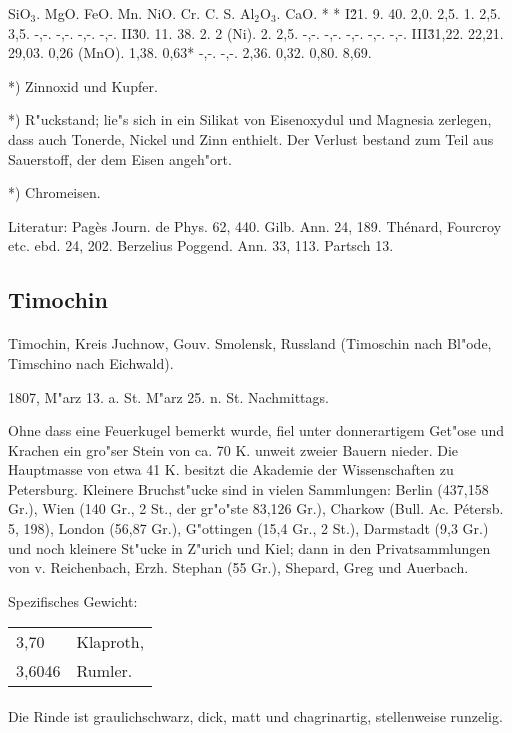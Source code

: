 \documentclass[a4paper, 11pt, oneside]{article}
\begin{document}
SiO$_{3}$. MgO. FeO. Mn. NiO. Cr. C. S. Al$_{2}$O$_{3}$. CaO. * *  
I\. 21. 9. 40. 2,0. 2,5. 1. 2,5. 3,5. -,-. -,-. -,-. -,-.  
II\. 30. 11. 38. 2. 2 (Ni). 2. 2,5. -,-. -,-. -,-. -,-. -,-.  
III\. 31,22. 22,21. 29,03. 0,26 (MnO). 1,38. 0,63* -,-. -,-. 2,36. 0,32. 0,80. 8,69.

*) Zinnoxid und Kupfer.

*) R"uckstand; lie"s sich in ein Silikat von Eisenoxydul und Magnesia zerlegen, dass auch Tonerde, Nickel und Zinn enthielt. Der Verlust bestand zum Teil aus Sauerstoff, der dem Eisen angeh"ort.

*) Chromeisen.

Literatur: Pagès Journ. de Phys. 62, 440. Gilb. Ann. 24, 189. Thénard, Fourcroy etc. ebd. 24, 202. Berzelius Poggend. Ann. 33, 113. Partsch 13.

\subsection{Timochin}
\normalsize
\paragraph{}
Timochin, Kreis Juchnow, Gouv. Smolensk, Russland (Timoschin nach Bl"ode, Timschino nach Eichwald).

1807, M"arz 13. a. St. M"arz 25. n. St. Nachmittags.

Ohne dass eine Feuerkugel bemerkt wurde, fiel unter donnerartigem Get"ose und Krachen ein gro"ser Stein von ca. 70 K. unweit zweier Bauern nieder. Die Hauptmasse von etwa 41 K. besitzt die Akademie der Wissenschaften zu Petersburg. Kleinere Bruchst"ucke sind in vielen Sammlungen: Berlin (437,158 Gr.), Wien (140 Gr., 2 St., der gr"o"ste 83,126 Gr.), Charkow (Bull. Ac. Pétersb. 5, 198), London (56,87 Gr.), G"ottingen (15,4 Gr., 2 St.), Darmstadt (9,3 Gr.) und noch kleinere St"ucke in Z"urich und Kiel; dann in den Privatsammlungen von v. Reichenbach, Erzh. Stephan (55 Gr.), Shepard, Greg und Auerbach.

Spezifisches Gewicht:
\begin{table}[!ht]
    \centering
    \begin{tabular}{l l}
        3,70 & Klaproth,\\
        3,6046 & Rumler.
    \end{tabular}
\end{table}
\paragraph{}
Die Rinde ist graulichschwarz, dick, matt und chagrinartig, stellenweise runzelig.
\end{document}
